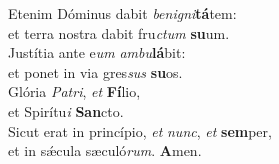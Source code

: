 \oddverse Etenim Dóminus dabit \textit{be}\textit{ni}\textit{gni}\textbf{tá}tem:~\*\\
\oddverse et terra nostra dabit fru\textit{ctum} \textbf{su}um.\\
\evenverse Justítia ante e\textit{um} \textit{am}\textit{bu}\textbf{lá}bit:~\*\\
\evenverse et ponet in via gres\textit{sus} \textbf{su}os.\\
\oddverse Glória \textit{Pa}\textit{tri}, \textit{et} \textbf{Fí}lio,~\*\\
\oddverse et Spirítu\textit{i} \textbf{San}cto.\\
\evenverse Sicut erat in princípio, \textit{et} \textit{nunc}, \textit{et} \textbf{sem}per,~\*\\
\evenverse et in sǽcula sæculó\textit{rum}. \textbf{A}men.\\
